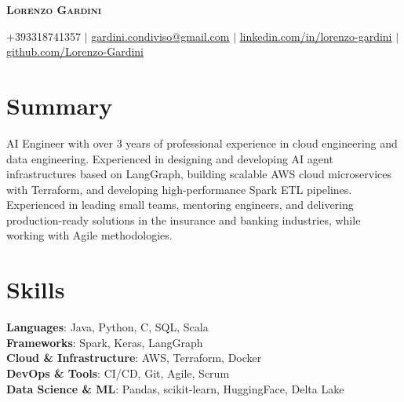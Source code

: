 \documentclass[letterpaper,11pt]{article}
\begin{document}
\begin{center}
    \textbf{\Huge \scshape Lorenzo Gardini} \\ \vspace{1pt}

    \vspace{0.5em}

    \small +393318741357 $|$ \href{mailto:gardini.condiviso@gmail.com}{\underline{gardini.condiviso@gmail.com}} $|$ 
    \href{https://www.linkedin.com/in/lorenzo-gardini/}{\underline{linkedin.com/in/lorenzo-gardini}} $|$
    \href{https://github.com/Lorenzo-Gardini}{\underline{github.com/Lorenzo-Gardini}}
\end{center}

\section{Summary}
 \begin{itemize}[leftmargin=0.15in, label={}]
    \small{\item{
     AI Engineer with over 3 years of professional experience in cloud engineering and data engineering. Experienced in designing and developing AI agent infrastructures based on LangGraph, building scalable AWS cloud microservices with Terraform, and developing high-performance Spark ETL pipelines. Experienced in leading small teams, mentoring engineers, and delivering production-ready solutions in the insurance and banking industries, while working with Agile methodologies.
    }}
 \end{itemize}

%
\section{Skills}
 \begin{itemize}[leftmargin=0.15in, label={}]
    \small{\item{
     \textbf{Languages}{: Java, Python, C, SQL, Scala} \\
     \textbf{Frameworks}{: Spark, Keras, LangGraph} \\
     \textbf{Cloud \& Infrastructure}{: AWS, Terraform, Docker} \\
     \textbf{DevOps \& Tools}{: CI/CD, Git, Agile, Scrum} \\
     \textbf{Data Science \& ML}{: Pandas, scikit-learn, HuggingFace, Delta Lake}
    }}
 \end{itemize}
\end{document}
